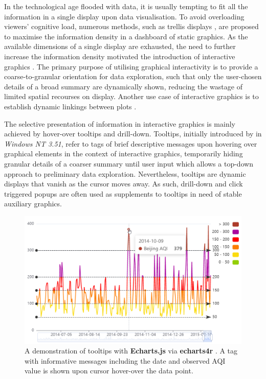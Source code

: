 \documentclass{aucklandthesis}
\begin{document}
In the technological age flooded with data, it is usually tempting to fit all the information in a single display upon data visualisation. To avoid overloading viewers' cognitive load, numerous methods, such as trellis displays \autocite{trellis}, are proposed to maximise the information density in a dashboard of static graphics. As the available dimensions of a single display are exhausted, the need to further increase the information density motivated the introduction of interactive graphics \autocite{intg}. The primary purpose of utilising graphical interactivity is to provide a coarse-to-granular orientation for data exploration, such that only the user-chosen details of a broad summary are dynamically shown, reducing the wastage of limited spatial recourses on display. Another use case of interactive graphics is to establish dynamic linkings between plots \autocite{intg}.

The selective presentation of information in interactive graphics is mainly achieved by hover-over tooltips and drill-down. Tooltips, initially introduced by \textcite{tt} in \emph{Windows NT 3.51}, refer to tags of brief descriptive messages upon hovering over graphical elements in the context of interactive graphics, temporarily hiding granular details of a coarser summary until user input which allows a top-down approach to preliminary data exploration. Nevertheless, tooltips are dynamic displays that vanish as the cursor moves away. As such, drill-down \autocite{plotly} and click triggered popups are often used as supplements to tooltips in need of stable auxiliary graphics.

\begin{figure}
\includegraphics[width=1\linewidth]{figures/tt-demo} \caption{A demonstration of tooltips with \textbf{Echarts.js} \autocite{echarts} via \textbf{echarts4r} \autocite{echarts4r}. A tag with informative messages including the date and observed AQI value is shown upon cursor hover-over the data point.}\label{fig:tt-demo}
\end{figure}
\end{document}
